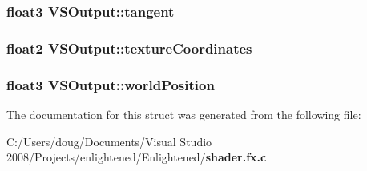 \subsubsection[{tangent}]{\setlength{\rightskip}{0pt plus 5cm}float3 {\bf VSOutput::tangent}}\label{struct_v_s_output_a645d68bb4487061a976c9de66d1350bb}
\subsubsection[{textureCoordinates}]{\setlength{\rightskip}{0pt plus 5cm}float2 {\bf VSOutput::textureCoordinates}}\label{struct_v_s_output_a7fcd6443a5043bbfd98d1ff3b415b84b}
\subsubsection[{worldPosition}]{\setlength{\rightskip}{0pt plus 5cm}float3 {\bf VSOutput::worldPosition}}\label{struct_v_s_output_a8151fbd902476f1b8fd2034c78f31ec5}


The documentation for this struct was generated from the following file:\begin{DoxyCompactItemize}
\item 
C:/Users/doug/Documents/Visual Studio 2008/Projects/enlightened/Enlightened/{\bf shader.fx.c}\end{DoxyCompactItemize}
